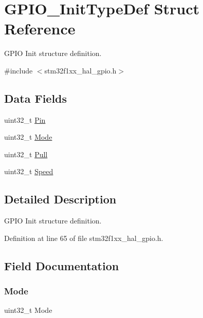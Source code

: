 \hypertarget{struct_g_p_i_o___init_type_def}{}\section{G\+P\+I\+O\+\_\+\+Init\+Type\+Def Struct Reference}
\label{struct_g_p_i_o___init_type_def}


G\+P\+IO Init structure definition.  




{\ttfamily \#include $<$stm32f1xx\+\_\+hal\+\_\+gpio.\+h$>$}

\subsection*{Data Fields}
\begin{DoxyCompactItemize}
\item 
uint32\+\_\+t \hyperlink{struct_g_p_i_o___init_type_def_a871d0ab74071724e96b7cc9ae2a7532b}{Pin}
\item 
uint32\+\_\+t \hyperlink{struct_g_p_i_o___init_type_def_a0ffc93ec511ed9cf1663f6939bd3e839}{Mode}
\item 
uint32\+\_\+t \hyperlink{struct_g_p_i_o___init_type_def_a6cdde08eb507b710f8179a4326548e26}{Pull}
\item 
uint32\+\_\+t \hyperlink{struct_g_p_i_o___init_type_def_ad04b2041f59d32492ec36a891418f3fd}{Speed}
\end{DoxyCompactItemize}


\subsection{Detailed Description}
G\+P\+IO Init structure definition. 

Definition at line 65 of file stm32f1xx\+\_\+hal\+\_\+gpio.\+h.



\subsection{Field Documentation}
\mbox{\label{struct_g_p_i_o___init_type_def_a0ffc93ec511ed9cf1663f6939bd3e839}} 
\subsubsection{\texorpdfstring{Mode}{Mode}}
{\footnotesize\ttfamily uint32\+\_\+t Mode}

